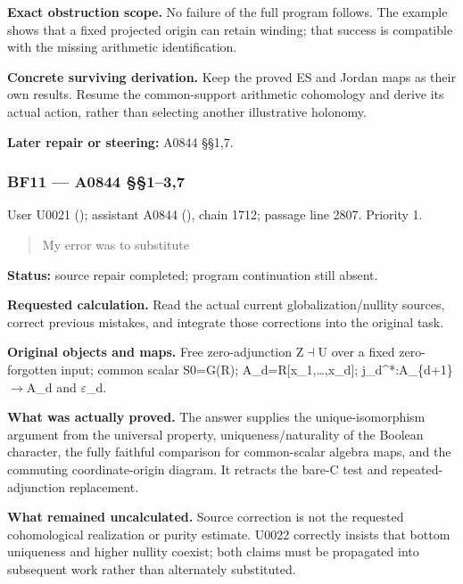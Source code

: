 \textbf{Exact obstruction scope.} No failure of the full program
follows. The example shows that a fixed projected origin can retain
winding; that success is compatible with the missing arithmetic
identification.

\textbf{Concrete surviving derivation.} Keep the proved ES and Jordan
maps as their own results. Resume the common-support arithmetic
cohomology and derive its actual action, rather than selecting another
illustrative holonomy.

\textbf{Later repair or steering:} A0844 §§1,7.

\subsubsection{BF11 --- A0844 §§1--3,7}\label{TranscriptLedgerStage:bf11-a0844-137}

User U0021 (\protect{});
assistant A0844 (\protect{}),
chain 1712; passage line 2807. Priority 1.

\begin{quote}
My error was to substitute
\end{quote}

\textbf{Status:} source repair completed; program continuation still
absent.

\textbf{Requested calculation.} Read the actual current
globalization/nullity sources, correct previous mistakes, and integrate
those corrections into the original task.

\textbf{Original objects and maps.} Free zero-adjunction
Z\allowbreak{}\ensuremath{⊣}\allowbreak{}U over a fixed zero-forgotten
input; common scalar S0=G(R); A\_d=R{[}x\_1,\ldots,x\_d{]};
j\_d\textasciicircum{}*:A\_\{d+1\}\allowbreak{}\ensuremath{→}\allowbreak{}A\_d
and \allowbreak{}\ensuremath{ε}\allowbreak{}\_d.

\textbf{What was actually proved.} The answer supplies the
unique-isomorphism argument from the universal property,
uniqueness/naturality of the Boolean character, the fully faithful
comparison for common-scalar algebra maps, and the commuting
coordinate-origin diagram. It retracts the bare-C test and
repeated-adjunction replacement.

\textbf{What remained uncalculated.} Source correction is not the
requested cohomological realization or purity estimate. U0022 correctly
insists that bottom uniqueness and higher nullity coexist; both claims
must be propagated into subsequent work rather than alternately
substituted.

